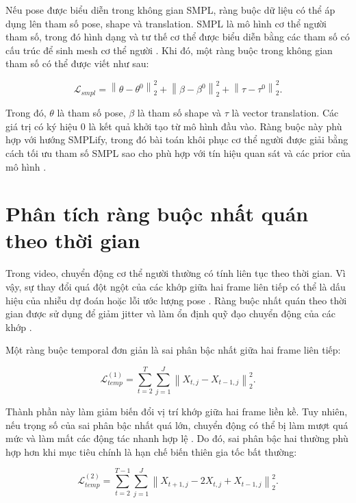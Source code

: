 \documentclass[../DoAn.tex]{subfiles}
\begin{document}
Nếu pose được biểu diễn trong không gian SMPL, ràng buộc dữ liệu có thể áp dụng lên tham số pose, shape và translation. SMPL là mô hình cơ thể người tham số, trong đó hình dạng và tư thế cơ thể được biểu diễn bằng các tham số có cấu trúc để sinh mesh cơ thể người \cite{smpl2015}. Khi đó, một ràng buộc trong không gian tham số có thể được viết như sau:

\begin{equation}
\mathcal{L}_{smpl}
=
\left\|
\theta - \theta^{0}
\right\|_2^2
+
\left\|
\beta - \beta^{0}
\right\|_2^2
+
\left\|
\tau - \tau^{0}
\right\|_2^2.
\end{equation}

Trong đó, $\theta$ là tham số pose, $\beta$ là tham số shape và $\tau$ là vector translation. Các giá trị có ký hiệu $0$ là kết quả khởi tạo từ mô hình đầu vào. Ràng buộc này phù hợp với hướng SMPLify, trong đó bài toán khôi phục cơ thể người được giải bằng cách tối ưu tham số SMPL sao cho phù hợp với tín hiệu quan sát và các prior của mô hình \cite{smplify2016,smpl2015}.

\section{Phân tích ràng buộc nhất quán theo thời gian}

Trong video, chuyển động cơ thể người thường có tính liên tục theo thời gian. Vì vậy, sự thay đổi quá đột ngột của các khớp giữa hai frame liên tiếp có thể là dấu hiệu của nhiễu dự đoán hoặc lỗi ước lượng pose \cite{physcap2020,shin2024wham}. Ràng buộc nhất quán theo thời gian được sử dụng để giảm jitter và làm ổn định quỹ đạo chuyển động của các khớp \cite{physcap2020}.

Một ràng buộc temporal đơn giản là sai phân bậc nhất giữa hai frame liên tiếp:

\begin{equation}
\mathcal{L}_{temp}^{(1)}
=
\sum_{t=2}^{T}
\sum_{j=1}^{J}
\left\|
X_{t,j} - X_{t-1,j}
\right\|_2^2.
\end{equation}

Thành phần này làm giảm biến đổi vị trí khớp giữa hai frame liền kề. Tuy nhiên, nếu trọng số của sai phân bậc nhất quá lớn, chuyển động có thể bị làm mượt quá mức và làm mất các động tác nhanh hợp lệ \cite{physcap2020}. Do đó, sai phân bậc hai thường phù hợp hơn khi mục tiêu chính là hạn chế biến thiên gia tốc bất thường:

\begin{equation}
\mathcal{L}_{temp}^{(2)}
=
\sum_{t=2}^{T-1}
\sum_{j=1}^{J}
\left\|
X_{t+1,j}
-
2X_{t,j}
+
X_{t-1,j}
\right\|_2^2.
\end{equation}
\end{document}
